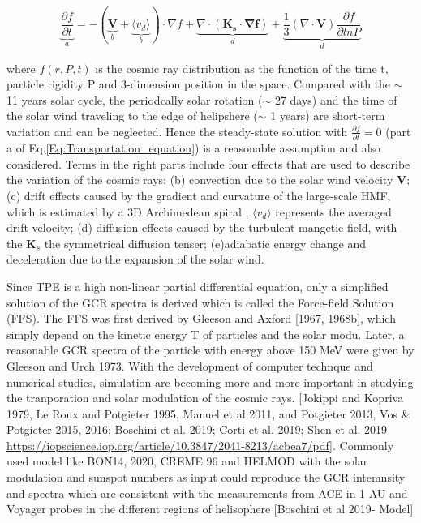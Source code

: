 	\begin{equation}
		\underbrace{\frac{\partial f}{\partial t}}_{a} = - ( \underbrace{\boldsymbol{V}}_{b} + \underbrace{\langle v_d \rangle }_{b}) \cdot \nabla f + \underbrace{\nabla \cdot (\boldsymbol{K_s \cdot \nabla f})}_{d} + \underbrace{\frac{1}{3}(\nabla \cdot \boldsymbol{V}) \frac{\partial f}{\partial ln P}}_{d}
		\label{Eq:Transportation_equation}
	\end{equation}

where $f(r, P, t)$ is the cosmic ray distribution as the function of the time t, particle rigidity P and 3-dimension position in the space. Compared with the $\sim$ 11 years solar cycle, the periodcally solar rotation ($\sim$ 27 days) and  the time of the solar wind traveling to the edge of helipshere ($\sim$ 1 years) are short-term variation and can be neglected. Hence the steady-state solution with  $\frac{\partial f}{\partial t} = 0$ (part a of Eq.\ref{Eq:Transportation_equation}) is a reasonable assumption and also considered. Terms in the right parts include four effects that are used to describe the variation of the cosmic rays: (b) convection due to the solar wind velocity $\boldsymbol{V}$; (c) drift effects caused by the gradient and curvature of the large-scale \ac{HMF}, which is estimated by a 3D Archimedean spiral \citet{Parker-1958}, $\langle v_d \rangle$ represents the averaged drift velocity; (d) diffusion effects caused by the turbulent mangetic field, with the $\boldsymbol{K}_s$ the symmetrical diffusion tenser; (e)adiabatic energy change and deceleration due to the expansion of the solar wind. 

Since TPE is a high non-linear partial differential equation, only a simplified solution of the GCR spectra is derived which is called the Force-field Solution (FFS). The FFS was first derived by Gleeson and Axford [1967, 1968b], which simply depend on the kinetic energy T of particles and the solar modu. Later, a reasonable GCR spectra of the particle with energy above 150 MeV were given by Gleeson and Urch 1973.
With the development of computer technque and numerical studies, simulation are becoming more and more important in studying the tranporation and solar modulation of the cosmic rays. [Jokippi and Kopriva 1979, Le Roux and Potgieter 1995, Manuel et al 2011, and Potgieter 2013, Vos \& Potgieter 2015, 2016; Boschini et al. 2019;
Corti et al. 2019; Shen et al. 2019 \url{https://iopscience.iop.org/article/10.3847/2041-8213/acbea7/pdf}]. 
Commonly used model like BON14, 2020, CREME 96 and HELMOD with the solar modulation and sunspot numbers as input could reproduce the GCR intemnsity and spectra which are consistent with the measurements from \ac{ACE} in 1 AU and Voyager probes in the different regions of helisophere [Boschini et al 2019- Model]

